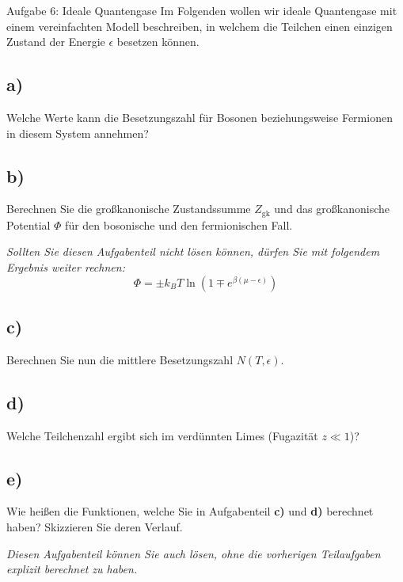 \begin{aufgabe}{Aufgabe 6: Ideale Quantengase}
    Im Folgenden wollen wir ideale Quantengase mit einem vereinfachten Modell beschreiben,
    in welchem die Teilchen einen einzigen Zustand der Energie $\epsilon$ besetzen können.

    \subsection{a)}
    Welche Werte kann die Besetzungszahl für Bosonen beziehungsweise Fermionen in diesem System annehmen?

    \subsection{b)}
    Berechnen Sie die großkanonische Zustandssumme $Z_\text{gk}$ und das großkanonische Potential $\Phi$ für den bosonische und den fermionischen Fall.

    \textit{Sollten Sie diesen Aufgabenteil nicht lösen können, dürfen Sie mit folgendem Ergebnis weiter rechnen:}
    \[
        \Phi = \pm k_B T \ln(1 \mp e^{\beta(\mu-\epsilon)})
    \]

    \subsection{c)}
    Berechnen Sie nun die mittlere Besetzungszahl $N(T, \epsilon)$.

    \subsection{d)}
    Welche Teilchenzahl ergibt sich im verdünnten Limes (Fugazität $z \ll 1$)?

    \subsection{e)}
    Wie heißen die Funktionen, welche Sie in Aufgabenteil \textbf{c)} und \textbf{d)} berechnet haben?
    Skizzieren Sie deren Verlauf.

    \textit{Diesen Aufgabenteil können Sie auch lösen, ohne die vorherigen Teilaufgaben explizit berechnet zu haben.}
\end{aufgabe}

